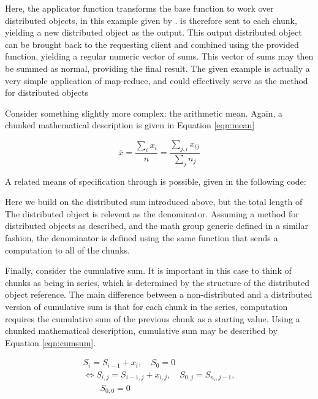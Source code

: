 Here, the  applicator function transforms the base  function to work over distributed objects, in this example given by .
 is therefore sent to each chunk, yielding a new distributed object as the output.
This output distributed object can be brought back to the requesting client and combined using the provided  function, yielding a regular  numeric vector of sums.
This vector of sums may then be summed as normal, providing the final result.
The given example is actually a very simple application of map-reduce, and could effectively serve as the  method for distributed objects

Consider something slightly more complex: the arithmetic mean.
Again, a chunked mathematical description is given in Equation \cref{eqn:mean}

\begin{equation}\label{eqn:mean}
    \overline{x} = \frac{\sum_{i}x_{i}}{n} = \frac{\sum_{j,i}x_{ij}}{\sum_j n_j}
\end{equation}

A related means of specification through  is possible, given in the following code:


Here we build on the distributed sum introduced above, but the total length of The distributed object is relevent as the denominator.
Assuming a  method for distributed objects as described, and the math group generic defined in a similar fashion, the denominator is defined using the same  function that sends a  computation to all of the chunks.

Finally, consider the cumulative sum.
It is important in this case to think of chunks as being in series, which is determined by the structure of the distributed object reference.
The main difference between a non-distributed and a distributed version of cumulative sum is that for each chunk in the series, computation requires the cumulative sum of the previous chunk as a starting value.
Using a chunked mathematical description, cumulative sum may be described by Equation \cref{eqn:cumsum}.

\begin{equation}
\begin{gathered}\label{eqn:cumsum}
    S_i = S_{i-1}+x_i, \quad S_0 = 0\\
    \iff S_{i,j} = S_{i-1,j} + x_{i,j}, \quad S_{0,j} = S_{n_i,j-1},\\
    \qquad S_{0,0} = 0
\end{gathered}
\end{equation}

